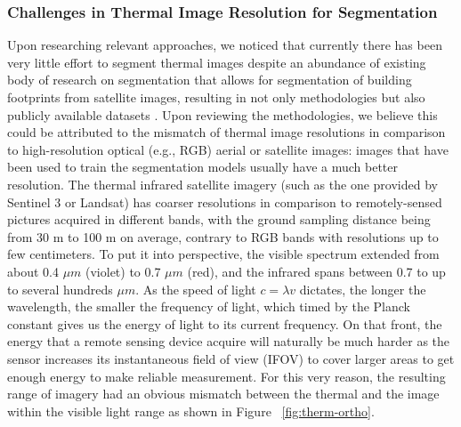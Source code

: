 \documentclass[preprint,12pt]{elsarticle}
\begin{document}
    \subsubsection{Challenges in Thermal Image Resolution for Segmentation}\label{seg:thermnum}%
    Upon researching relevant approaches, we noticed that currently there has been very little effort to segment thermal images despite an abundance of existing body of research on segmentation \cite{kirillov_segment_2023} that allows for segmentation of building footprints from satellite images, resulting in not only methodologies but also publicly available datasets \cite{microsoft_microsoftglobalmlbuildingfootprints_2024}. Upon reviewing the methodologies, we believe this could be attributed to the mismatch of thermal image resolutions in comparison to high-resolution optical (e.g., RGB) aerial or satellite images: images that have been used to train the segmentation models usually have a much better resolution. The thermal infrared satellite imagery (such as the one provided by Sentinel 3 or Landsat) has coarser resolutions in comparison to remotely-sensed pictures acquired in different bands, with the ground sampling distance being from 30 m to 100 m on average, contrary to RGB bands with resolutions up to few centimeters. To put it into perspective, the visible spectrum extended from about 0.4 $\mu m$ (violet) to 0.7 $\mu m$ (red), and the infrared spans between 0.7 to up to several hundreds $\mu m$. As the speed of light $c=\lambda v$ dictates, the longer the wavelength, the smaller the frequency of light, which timed by the Planck constant gives us the energy of light to its current frequency. On that front, the energy that a remote sensing device acquire will naturally be much harder as the sensor increases its instantaneous field of view (IFOV) to cover larger areas to get enough energy to make reliable measurement. For this very reason, the resulting range of imagery had an obvious mismatch between the thermal and the image within the visible light range as shown in Figure ~\ref{fig:therm-ortho}.

\end{document}
